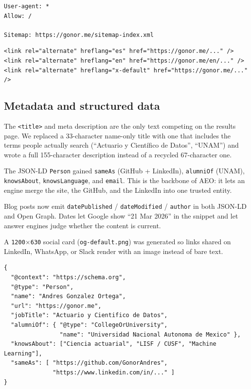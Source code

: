 \documentclass[11pt]{article}
\begin{document}
\begin{lstlisting}[caption={robots.txt --- allow everything, point at the sitemap}]
User-agent: *
Allow: /

Sitemap: https://gonor.me/sitemap-index.xml
\end{lstlisting}

\begin{lstlisting}[caption={hreflang pair emitted on every page}]
<link rel="alternate" hreflang="es" href="https://gonor.me/..." />
<link rel="alternate" hreflang="en" href="https://gonor.me/en/..." />
<link rel="alternate" hreflang="x-default" href="https://gonor.me/..." />
\end{lstlisting}

\subsection{Metadata and structured data}

\begin{description}[leftmargin=0em, style=nextline]
  \item[Titles and descriptions rewritten.] The \texttt{<title>} and meta
  description are the only text competing on the results page. We replaced a
  33-character name-only title with one that includes the terms people actually
  search (``Actuario y Cient\'ifico de Datos'', ``UNAM'') and wrote a full
  155-character description instead of a recycled 67-character one.
  \item[Person entity enriched.] The JSON-LD \texttt{Person} gained
  \texttt{sameAs} (GitHub + LinkedIn), \texttt{alumniOf} (UNAM),
  \texttt{knowsAbout}, \texttt{knowsLanguage}, and \texttt{email}. This is the
  backbone of AEO: it lets an engine merge the site, the GitHub, and the
  LinkedIn into one trusted entity.
  \item[Article schema completed.] Blog posts now emit \texttt{datePublished} /
  \texttt{dateModified} / \texttt{author} in both JSON-LD and Open Graph. Dates
  let Google show ``21 Mar 2026'' in the snippet and let answer engines judge
  whether the content is current.
  \item[Open Graph image created.] A \texttt{1200$\times$630} social card
  (\texttt{og-default.png}) was generated so links shared on LinkedIn,
  WhatsApp, or Slack render with an image instead of bare text.
\end{description}

\begin{lstlisting}[caption={The Person entity --- sameAs is the load-bearing field}]
{
  "@context": "https://schema.org",
  "@type": "Person",
  "name": "Andres Gonzalez Ortega",
  "url": "https://gonor.me",
  "jobTitle": "Actuario y Cientifico de Datos",
  "alumniOf": { "@type": "CollegeOrUniversity",
                "name": "Universidad Nacional Autonoma de Mexico" },
  "knowsAbout": ["Ciencia actuarial", "LISF / CUSF", "Machine Learning"],
  "sameAs": [ "https://github.com/GonorAndres",
              "https://www.linkedin.com/in/..." ]
}
\end{lstlisting}
\end{document}

